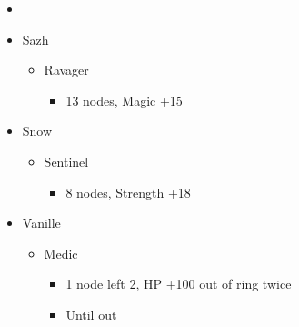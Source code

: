 \begin{menu}
\begin{itemize}
    \paradigm
    \begin{itemize}
        \item {}%
{}%
{\paradigmline{(\rav)}{\rav}{\rav}}%
{\paradigmline{\rav}{(\rav)}{(\med)}}%
{\paradigmline{\com}{\com}{(\med)}}%
{\paradigmline[5]{\textit{\rav}}{\textit{(\rav)}}{\textit{\sab}}}%
{\paradigmline{\com}{\com}{\rav}}
    \end{itemize}
    \crystarium
    \begin{itemize}
        \item Sazh
        \begin{itemize}
            \item Ravager
            \begin{itemize}
                \item 13 nodes, Magic +15
            \end{itemize}
        \end{itemize}
        \item Snow
        \begin{itemize}
            \item Sentinel
            \begin{itemize}
                \item 8 nodes, Strength +18
            \end{itemize}
        \end{itemize}
        \item Vanille
        \begin{itemize}
            \item Medic
            \begin{itemize}
                \item 1 node left 2, HP +100 out of ring twice
                \item Until out
            \end{itemize}
        \end{itemize}
    \end{itemize}
\end{itemize}
\end{menu}


